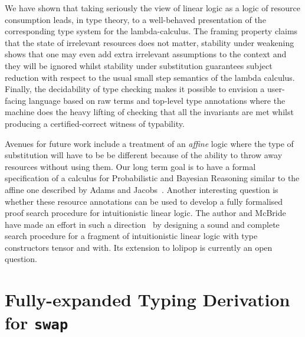 \documentclass[a4paper,UKenglish]{lipics-v2016}
\begin{document}
We have shown that taking seriously the view of linear logic as a
logic of resource consumption leads, in type theory, to a well-behaved
presentation of the corresponding type system for the lambda-calculus.
The framing property claims that the state of irrelevant resources does
not matter, stability under weakening shows that one may even add extra
irrelevant assumptions to the context and they will be ignored whilst
stability under substitution guarantees subject reduction with respect
to the usual small step semantics of the lambda calculus. Finally, the
decidability of type checking makes it possible to envision a user-facing
language based on raw terms and top-level type annotations where the
machine does the heavy lifting of checking that all the invariants are
met whilst producing a certified-correct witness of typability.

Avenues for future work include a treatment of an \emph{affine} logic
where the type of substitution will have to be be different because
of the ability to throw away resources without using them. Our long
term goal is to have a formal specification of a calculus for Probabilistic
and Bayesian Reasoning similar to the affine one described by Adams
and Jacobs~\cite{Adams2015Type}.
Another interesting question is whether these resource annotations
can be used to develop a fully formalised proof search procedure for
intuitionistic linear logic. The author and McBride have made an effort
in such a direction~\cite{Allais2015Proof} by designing a sound and
complete search procedure for a fragment of intuitionistic linear logic
with type constructors tensor and with. Its extension to lolipop is
currently an open question.






\appendix

\section{Fully-expanded Typing Derivation for \texttt{swap}}

\end{document}
